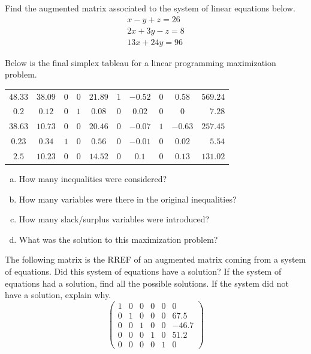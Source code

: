 \documentclass[12pt,letterpaper]{exam}
\begin{document}
\begin{questions}
\newpage
\question[10] Find the augmented matrix associated to the system of linear equations below. 
	\[
	\begin{gathered}
	x - y + z= 26 \\
	2x + 3y - z= 8 \\
	13x + 24y= 96
	\end{gathered}
	\]



\newpage
\question[10] Below is the final simplex tableau for a linear programming maximization problem. \par
	\begin{table}[H]
	\centering
	\begin{tabular}{cccccccccr}
	$48.33$ & $38.09$ & $0$ & $0$ & $21.89$ & $1$ & $-0.52$ & $0$ & $0.58$ & $569.24$ \\
	$0.2$ & $0.12$ & $0$ & $1$ & $0.08$ & $0$ & $0.02$ & $0$ & $0$ & $7.28$ \\
	$38.63$ & $10.73$ & $0$ & $0$ & $20.46$ & $0$ & $-0.07$ & $1$ & $-0.63$ & $257.45$ \\
	$0.23$ & $0.34$ & $1$ & $0$ & $0.56$ & $0$ & $-0.01$ & $0$ & $0.02$ & $5.54$ \\
	$2.5$ & $10.23$ & $0$ & $0$ & $14.52$ & $0$ & $0.1$ & $0$ & $0.13$ & $131.02$
	\end{tabular}
	\end{table} \par

\begin{enumerate}[(a)]
\item How many inequalities were considered?
\item How many variables were there in the original inequalities?
\item How many slack/surplus variables were introduced?
\item What was the solution to this maximization problem?
\end{enumerate}



\newpage
\question[10] The following matrix is the RREF of an augmented matrix coming from a system of equations. Did this system of equations have a solution? If the system of equations had a solution, find all the possible solutions. If the system did not have a solution, explain why. 
	\[
	\begin{pmatrix}
	1 & 0 & 0 & 0 & 0 & 0 \\
	0 & 1 & 0 & 0 & 0 & 67.5 \\
	0 & 0 & 1 & 0 & 0 & -46.7 \\
	0 & 0 & 0 & 1 & 0 & 51.2 \\
	0 & 0 & 0 & 0 & 1 & 0 
	\end{pmatrix}
	\]




\end{questions}
\end{document}
